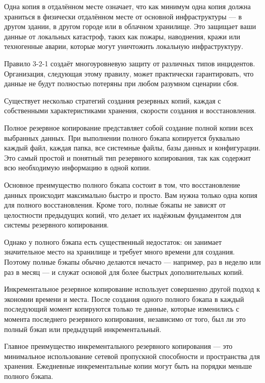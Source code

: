 \documentclass{SibFU-docs}
\begin{document}
Одна копия в отдалённом месте означает, что как минимум одна копия должна храниться в физически отдалённом месте от основной инфраструктуры --- в другом здании, в другом городе или в облачном хранилище. Это защищает ваши данные от локальных катастроф, таких как пожары, наводнения, кражи или техногенные аварии, которые могут уничтожить локальную инфраструктуру.

Правило 3-2-1 создаёт многоуровневую защиту от различных типов инцидентов. Организация, следующая этому правилу, может практически гарантировать, что данные не будут полностью потеряны при любом разумном сценарии сбоя.


Существует несколько стратегий создания резервных копий, каждая с собственными характеристиками хранения, скорости создания и восстановления.


Полное резервное копирование представляет собой создание полной копии всех выбранных данных. При выполнении полного бэкапа копируется буквально каждый файл, каждая папка, все системные файлы, базы данных и конфигурации. Это самый простой и понятный тип резервного копирования, так как содержит всю необходимую информацию в одной копии.

Основное преимущество полного бэкапа состоит в том, что восстановление данных происходит максимально быстро и просто. Вам нужна только одна копия для полного восстановления. Кроме того, полные бэкапы не зависят от целостности предыдущих копий, что делает их надёжным фундаментом для системы резервного копирования.

Однако у полного бэкапа есть существенный недостаток: он занимает значительное место на хранилище и требует много времени для создания. Поэтому полные бэкапы обычно делаются нечасто --- например, раз в неделю или раз в месяц --- и служат основой для более быстрых дополнительных копий.


Инкрементальное резервное копирование использует совершенно другой подход к экономии времени и места. После создания одного полного бэкапа в каждый последующий момент копируются только те данные, которые изменились с момента последнего резервного копирования, независимо от того, был ли это полный бэкап или предыдущий инкрементальный.

Главное преимущество инкрементального резервного копирования --- это минимальное использование сетевой пропускной способности и пространства для хранения. Ежедневные инкрементальные копии могут быть на порядки меньше полного бэкапа.
\end{document}
